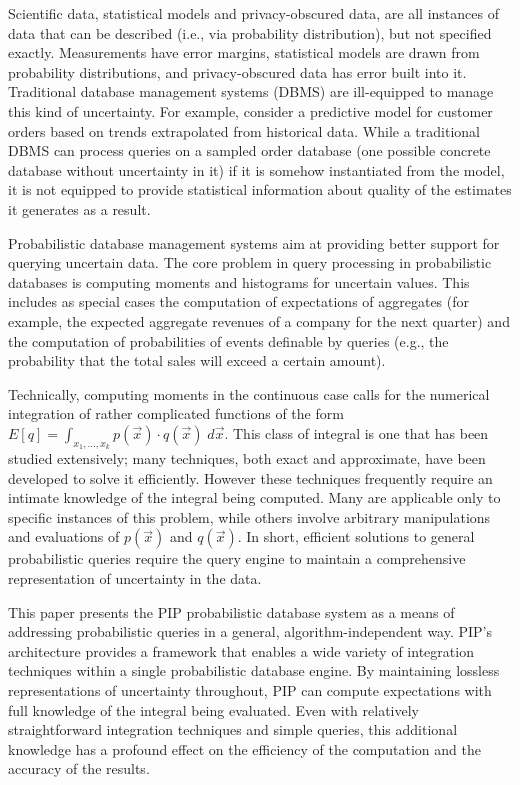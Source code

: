 Scientific data, statistical models and privacy-obscured data, are all instances of data that can be described (i.e., via probability distribution), but not specified exactly.  Measurements have error margins, statistical models are drawn from probability distributions, and privacy-obscured data has error built into it.  Traditional database management systems (DBMS) are ill-equipped to manage this kind of uncertainty.  For  example, consider  a predictive model  for customer orders based  on trends extrapolated  from historical data.   While a traditional  DBMS can process  queries on  a sampled  order data\-base (one possible  concrete database without  uncertainty in it) if  it is somehow instantiated  from the  model, it is  not equipped  to provide statistical information about quality of the estimates it generates as a result.

Probabilistic  database  management  systems \cite{dalvi07efficient, WidomTrio2008, KochMayBMS2008, SD2007, ORION, MCDB, BayesStore} aim at providing better support for querying uncertain data.  The core problem in query processing in probabilistic databases is computing moments and histograms for uncertain values. This includes as special cases the computation of expectations of aggregates (for example, the expected aggregate revenues of a company for the next quarter) and the computation of probabilities of events definable by queries (e.g., the probability that the total sales will exceed a certain amount).

Technically, computing moments in the continuous case calls for the numerical integration of rather complicated functions of the form $E[q] = \int_{x_1,\ldots,x_k} p(\vec{x}) \cdot q(\vec{x}) \; d\vec{x}.$
This class of integral is one that has been studied extensively; many techniques, both exact and approximate, have been developed to solve it efficiently.  However these techniques frequently require an intimate knowledge of the integral being computed.  Many are applicable only to specific instances of this problem, while others involve arbitrary manipulations and evaluations of $p(\vec x)$ and $q(\vec x)$.  In short, efficient solutions to general probabilistic queries require the query engine to maintain a comprehensive representation of uncertainty in the data.

This paper presents the PIP probabilistic database system as a means of addressing probabilistic queries in a general, algorithm-independent way.  PIP's architecture provides a framework that enables a wide variety of integration techniques within a single probabilistic database engine.  By maintaining lossless representations of uncertainty throughout, PIP can compute expectations with full knowledge of the integral being evaluated.  Even with relatively straightforward integration techniques and simple queries, this additional knowledge has a profound effect on the efficiency of the computation and the accuracy of the results.

